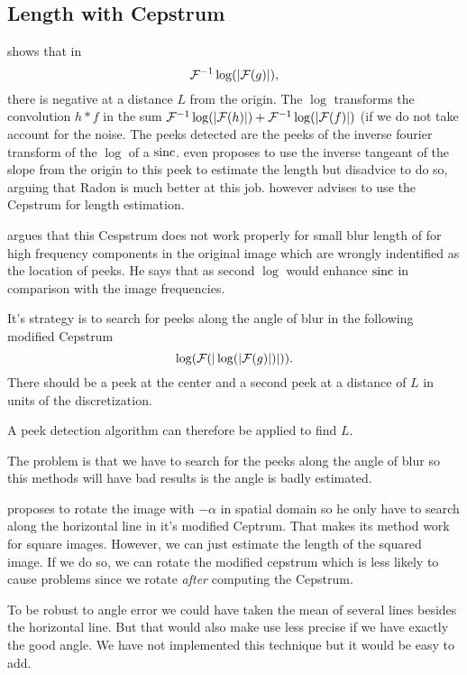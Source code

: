 

\subsection{Length with Cepstrum}
\label{subsec:Cep}
\cite{biemond1990iterative} shows that in
\[ \mathcal{F}^{-1}\log(|\mathcal{F}(g)|), \]
there is negative at a distance $L$ from the origin.
The $\log$ transforms the convolution $h*f$ in the sum
$\mathcal{F}^{-1}\log(|\mathcal{F}(h)|) + \mathcal{F}^{-1}\log(|\mathcal{F}(f)|)$
(if we do not take account for the noise.
The peeks detected are the peeks of the inverse fourier
transform of the $\log$ of a $\operatorname{sinc}$.
\cite{krahmer2006blind} even proposes to use the inverse
tangeant of the slope from the origin to this peek to
estimate the length but disadvice to do so,
arguing that Radon is much better at this job.
\cite{krahmer2006blind} however advises to use the Cepstrum
for length estimation.

\cite{Deshpande2014606} argues that this Cespstrum does
not work properly for small blur length of for high
frequency components in the original image which
are wrongly indentified as the location of peeks.
He says that as second $\log$ would enhance $\operatorname{sinc}$ in comparison
with the image frequencies.

It's strategy is to search for peeks
along the angle of blur in
the following modified Cepstrum
\[ \log(\mathcal{F}(|\log(|\mathcal{F}(g)|)|)). \]
There should be a peek at the center and a second peek
at a distance of $L$ in units of the discretization.

A peek detection algorithm can therefore be applied
to find $L$.

The problem is that we have to search for the peeks along
the angle of blur so this methods will have
bad results is the angle is badly estimated.

\cite{Deshpande2014606} proposes to rotate the image
with $-\alpha$ in spatial domain so he only have to
search along the horizontal line in it's modified Ceptrum.
That makes its method work for square images.
However, we can just estimate the length of the squared image.
If we do so, we can rotate the modified cepstrum which is less
likely to cause problems since we rotate \emph{after}
computing the Cepstrum.

To be robust to angle error we could have taken the mean of
several lines besides the horizontal line.
But that would also make use less precise if we have exactly
the good angle.
We have not implemented this technique but it would
be easy to add.

